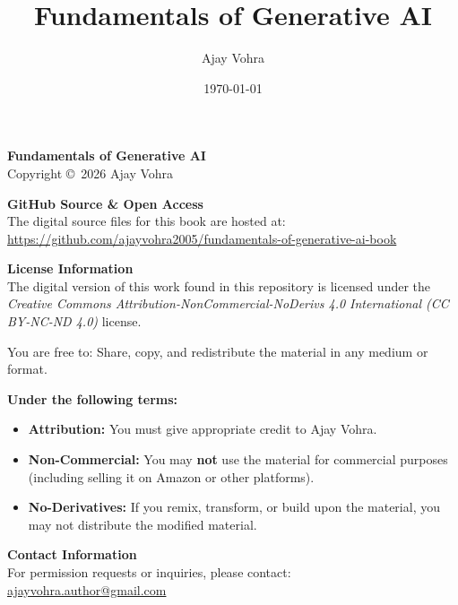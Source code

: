 \documentclass{book}
\title{Fundamentals of Generative AI}
\author{Ajay Vohra}
\date{\today}
\begin{document}
\newpage
\thispagestyle{empty} %
\setlength{\parindent}{0pt} %
\small %

\vspace*{\fill} %

{\centering
\textbf{\large Fundamentals of Generative AI} \\[0.5em]
Copyright \copyright\ 2026 Ajay Vohra
\par}

\vspace{1em}

\textbf{GitHub Source \& Open Access} \\
The digital source files for this book are hosted at: \\
\url{https://github.com/ajayvohra2005/fundamentals-of-generative-ai-book}

\vspace{1.5em}

\textbf{License Information} \\
The digital version of this work found in this repository is licensed under the \textit{Creative Commons Attribution-NonCommercial-NoDerivs 4.0 International (CC BY-NC-ND 4.0)} license.

\vspace{0.5em}
You are free to: Share, copy, and redistribute the material in any medium or format.

\vspace{0.5em}
\textbf{Under the following terms:}
\begin{itemize}[leftmargin=1.5em, label={--}, noitemsep]
    \item \textbf{Attribution:} You must give appropriate credit to Ajay Vohra.
    \item \textbf{Non-Commercial:} You may \textbf{not} use the material for commercial purposes (including selling it on Amazon or other platforms).
    \item \textbf{No-Derivatives:} If you remix, transform, or build upon the material, you may not distribute the modified material.
\end{itemize}

\vspace{1.5em}

\textbf{Contact Information} \\
For permission requests or inquiries, please contact: \\
\href{mailto:ajayvohra.author@gmail.com}{ajayvohra.author@gmail.com}
\end{document}
